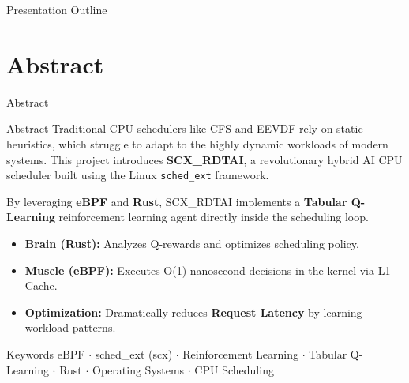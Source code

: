 \documentclass[aspectratio=169]{beamer}
\begin{document}
\begin{frame}{Presentation Outline}
    \tableofcontents
\end{frame}

\section{Abstract}

\begin{frame}{Abstract}
  \begin{block}{Abstract}
    \small
    Traditional CPU schedulers like CFS and EEVDF rely on static heuristics, which struggle to adapt to the highly dynamic workloads of modern systems. This project introduces \textbf{SCX\_RDTAI}, a revolutionary hybrid AI CPU scheduler built using the Linux \texttt{sched\_ext} framework.

    By leveraging \textbf{eBPF} and \textbf{Rust}, SCX\_RDTAI implements a \textbf{Tabular Q-Learning} reinforcement learning agent directly inside the scheduling loop. 

    \begin{itemize}\itemsep2pt
      \item \textbf{Brain (Rust):} Analyzes Q-rewards and optimizes scheduling policy.
      \item \textbf{Muscle (eBPF):} Executes O(1) nanosecond decisions in the kernel via L1 Cache.
      \item \textbf{Optimization:} Dramatically reduces \textbf{Request Latency} by learning workload patterns.
    \end{itemize}
  \end{block}

  \begin{exampleblock}{Keywords}
    \small
    eBPF $\cdot$ sched\_ext (scx) $\cdot$ Reinforcement Learning $\cdot$ Tabular Q-Learning $\cdot$
    Rust $\cdot$ Operating Systems $\cdot$ CPU Scheduling
  \end{exampleblock}
\end{frame}
\end{document}
